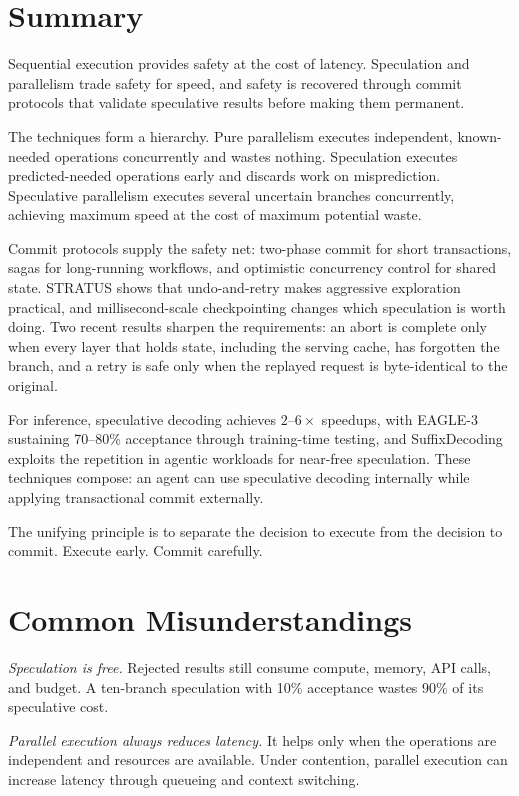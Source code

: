 \documentclass[11pt]{book}
\begin{document}
\section{Summary}

Sequential execution provides safety at the cost of latency. Speculation and parallelism trade safety for speed, and safety is recovered through commit protocols that validate speculative results before making them permanent.

The techniques form a hierarchy. Pure parallelism executes independent, known-needed operations concurrently and wastes nothing. Speculation executes predicted-needed operations early and discards work on misprediction. Speculative parallelism executes several uncertain branches concurrently, achieving maximum speed at the cost of maximum potential waste.

Commit protocols supply the safety net: two-phase commit for short transactions, sagas for long-running workflows, and optimistic concurrency control for shared state. STRATUS shows that undo-and-retry makes aggressive exploration practical, and millisecond-scale checkpointing changes which speculation is worth doing. Two recent results sharpen the requirements: an abort is complete only when every layer that holds state, including the serving cache, has forgotten the branch, and a retry is safe only when the replayed request is byte-identical to the original.

For inference, speculative decoding achieves $2$--$6\times$ speedups, with EAGLE-3 sustaining 70--80\% acceptance through training-time testing, and SuffixDecoding exploits the repetition in agentic workloads for near-free speculation. These techniques compose: an agent can use speculative decoding internally while applying transactional commit externally.

The unifying principle is to separate the decision to execute from the decision to commit. Execute early. Commit carefully.

\section{Common Misunderstandings}

\textit{Speculation is free.} Rejected results still consume compute, memory, API calls, and budget. A ten-branch speculation with 10\% acceptance wastes 90\% of its speculative cost.

\textit{Parallel execution always reduces latency.} It helps only when the operations are independent and resources are available. Under contention, parallel execution can increase latency through queueing and context switching.
\end{document}
